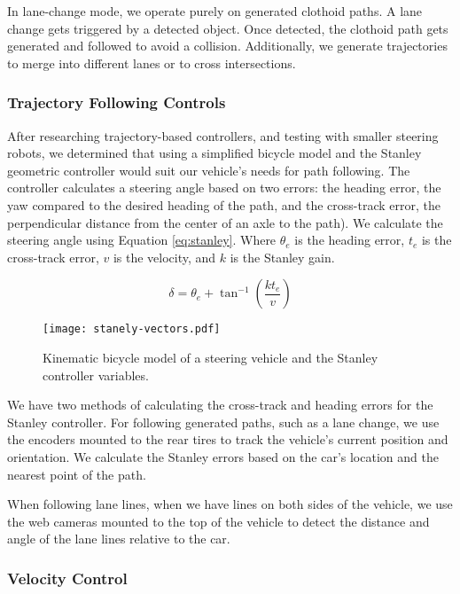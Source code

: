In lane-change mode, we operate purely on generated clothoid paths. A
lane change gets triggered by a detected object. Once detected, the
clothoid path gets generated and followed to avoid a collision.
Additionally, we generate trajectories to merge into different lanes or
to cross intersections.

\subsubsection{Trajectory Following Controls}

After researching trajectory-based controllers, and testing with
smaller steering robots, we determined that using a simplified bicycle
model and the Stanley geometric controller would suit our vehicle’s
needs for path following. The controller calculates a steering angle
based on two errors: the heading error, the yaw compared to the desired
heading of the path, and the cross-track error, the perpendicular
distance from the center of an axle to the path). We calculate the
steering angle using Equation \ref{eq:stanley}. Where \(\theta_e\) is
the heading error, \(t_e\) is the cross-track error, \(v\) is the
velocity, and \(k\) is the Stanley gain.

\begin{equation}
  \label{eq:stanley}
  \delta = \theta_e + \tan^{-1}\left(\frac{k t_e}{v}\right)
\end{equation}

\begin{figure}[ht!]
  \centering
  \texttt{[image: stanely-vectors.pdf]}
  \caption{
    Kinematic bicycle model of a steering vehicle and the Stanley
    controller variables.
  }
\end{figure}

We have two methods of calculating the cross-track and heading errors
for the Stanley controller. For following generated paths, such as a
lane change, we use the encoders mounted to the rear tires to track the
vehicle’s current position and orientation. We calculate the Stanley
errors based on the car’s location and the nearest point of the path.

When following lane lines, when we have lines on both sides of the
vehicle, we use the web cameras mounted to the top of the vehicle to
detect the distance and angle of the lane lines relative to the car.

\subsubsection{Velocity Control}

